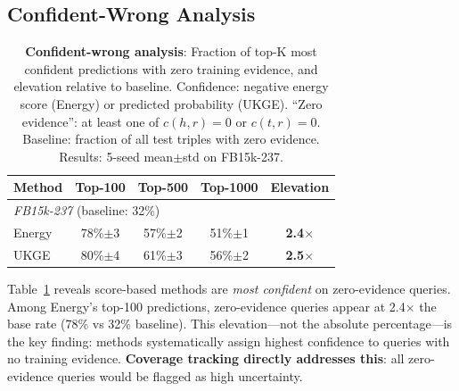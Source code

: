 \subsection{Confident-Wrong Analysis}

\begin{table}[t]
\centering
\caption{\textbf{Confident-wrong analysis}: Fraction of top-K most confident predictions with zero training evidence, and elevation relative to baseline. Confidence: negative energy score (Energy) or predicted probability (UKGE). ``Zero evidence'': at least one of $c(h,r)=0$ or $c(t,r)=0$. Baseline: fraction of all test triples with zero evidence. Results: 5-seed mean$\pm$std on FB15k-237.\label{tab:confident_wrong}}
\small
\begin{tabular}{lcccc}
\toprule
Method & Top-100 & Top-500 & Top-1000 & Elevation \\
\midrule
\multicolumn{5}{l}{\textit{FB15k-237} (baseline: 32\%)} \\
Energy & 78\%$\pm$3 & 57\%$\pm$2 & 51\%$\pm$1 & \textbf{2.4$\times$} \\
UKGE & 80\%$\pm$4 & 61\%$\pm$3 & 56\%$\pm$2 & \textbf{2.5$\times$} \\
\bottomrule
\end{tabular}
\end{table}

Table~\ref{tab:confident_wrong} reveals score-based methods are \emph{most confident} on zero-evidence queries. Among Energy's top-100 predictions, zero-evidence queries appear at 2.4$\times$ the base rate (78\% vs 32\% baseline). This elevation---not the absolute percentage---is the key finding: methods systematically assign highest confidence to queries with no training evidence. \textbf{Coverage tracking directly addresses this}: all zero-evidence queries would be flagged as high uncertainty.

